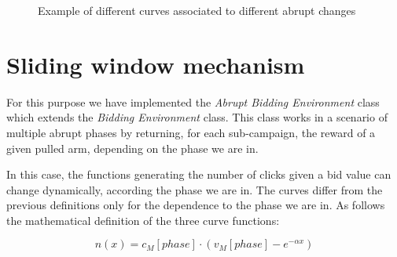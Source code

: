 \begin{figure}[!htb]
    \caption{Example of different curves associated to different abrupt changes}
    \label{abruptFigure}
\end{figure}


\section{Sliding window mechanism}
For this purpose we have implemented the \textit{Abrupt Bidding Environment} class which extends the \textit{Bidding Environment} class. This class works in a scenario of multiple abrupt phases by returning, for each sub-campaign, the reward of a given pulled arm, depending on the phase we are in.

In this case, the functions generating the number of clicks given a bid value can change dynamically, according the phase we are in.
The curves differ from the previous definitions only for the dependence to the phase we are in. As follows the mathematical definition of the three curve functions:

\begin{equation}
    n(x) = c_{M}[phase] \cdot (v_{M}[phase] - e^{-\alpha x})
\end{equation}

